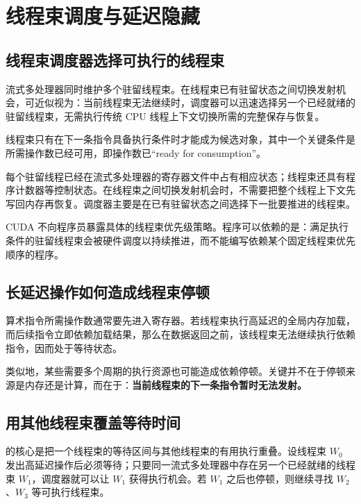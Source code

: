 \section{线程束调度与延迟隐藏}

\subsection{线程束调度器选择可执行的线程束}

流式多处理器同时维护多个驻留线程束。在线程束已有驻留状态之间切换发射机会，可近似视为：当前线程束无法继续时，调度器可以迅速选择另一个已经就绪的驻留线程束，无需执行传统 CPU 线程上下文切换所需的完整保存与恢复。

线程束只有在下一条指令具备执行条件时才能成为候选对象，其中一个关键条件是所需操作数已经可用，即操作数已“ready for consumption”。

\begin{mechanismbox}
每个驻留线程已经在流式多处理器的寄存器文件中占有相应状态；线程束还具有程序计数器等控制状态。在线程束之间切换发射机会时，不需要把整个线程上下文先写回内存再恢复。调度器主要是在已有驻留状态之间选择下一批要推进的线程束。
\end{mechanismbox}

CUDA 不向程序员暴露具体的线程束优先级策略。程序可以依赖的是：满足执行条件的驻留线程束会被硬件调度以持续推进，而不能编写依赖某个固定线程束优先顺序的程序。

\subsection{长延迟操作如何造成线程束停顿}

算术指令所需操作数通常要先进入寄存器。若线程束执行高延迟的全局内存加载，而后续指令立即依赖加载结果，那么在数据返回之前，该线程束无法继续执行依赖指令，因而处于等待状态。

类似地，某些需要多个周期的执行资源也可能造成依赖停顿。关键并不在于停顿来源是内存还是计算，而在于：\textbf{当前线程束的下一条指令暂时无法发射。}

\subsection{用其他线程束覆盖等待时间}

的核心是把一个线程束的等待区间与其他线程束的有用执行重叠。设线程束 \(W_0\) 发出高延迟操作后必须等待；只要同一流式多处理器中存在另一个已经就绪的线程束 \(W_1\)，调度器就可以让 \(W_1\) 获得执行机会。若 \(W_1\) 之后也停顿，则继续寻找 \(W_2\)、\(W_3\) 等可执行线程束。

